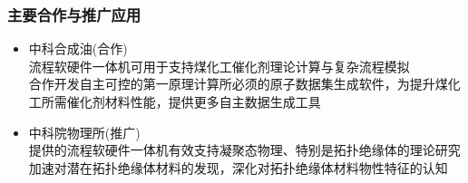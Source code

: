 \begin{frame}
	\frametitle{主要合作与推广应用}
	\begin{itemize}
	 \setlength{\itemsep}{10pt}
		\item 中科合成油(合作)\\
		流程软硬件一体机可用于支持煤化工催化剂理论计算与复杂流程模拟\\
		合作开发自主可控的第一原理计算所必须的原子数据集生成软件，为提升煤化工所需催化剂材料性能，提供更多自主数据生成工具
		\item 中科院物理所(推广)\\
		提供的流程软硬件一体机有效支持凝聚态物理、特别是拓扑绝缘体的理论研究\\
		加速对潜在拓扑绝缘体材料的发现，深化对拓扑绝缘体材料物性特征的认知
	\end{itemize}
\end{frame}

